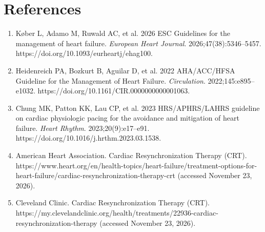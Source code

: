 \section*{References}
\begin{enumerate}
  \item Køber L, Adamo M, Ruwald AC, et al. 2026 ESC Guidelines for the management of heart failure. \textit{European Heart Journal}. 2026;47(38):5346--5457. https://doi.org/10.1093/eurheartj/ehag100.
  \item Heidenreich PA, Bozkurt B, Aguilar D, et al. 2022 AHA/ACC/HFSA Guideline for the Management of Heart Failure. \textit{Circulation}. 2022;145:e895--e1032. https://doi.org/10.1161/CIR.0000000000001063.
  \item Chung MK, Patton KK, Lau CP, et al. 2023 HRS/APHRS/LAHRS guideline on cardiac physiologic pacing for the avoidance and mitigation of heart failure. \textit{Heart Rhythm}. 2023;20(9):e17--e91. https://doi.org/10.1016/j.hrthm.2023.03.1538.
  \item American Heart Association. Cardiac Resynchronization Therapy (CRT). https://www.heart.org/en/health-topics/heart-failure/treatment-options-for-heart-failure/cardiac-resynchronization-therapy-crt (accessed November 23, 2026).
  \item Cleveland Clinic. Cardiac Resynchronization Therapy (CRT). https://my.clevelandclinic.org/health/treatments/22936-cardiac-resynchronization-therapy (accessed November 23, 2026).
\end{enumerate}
\clearpage
